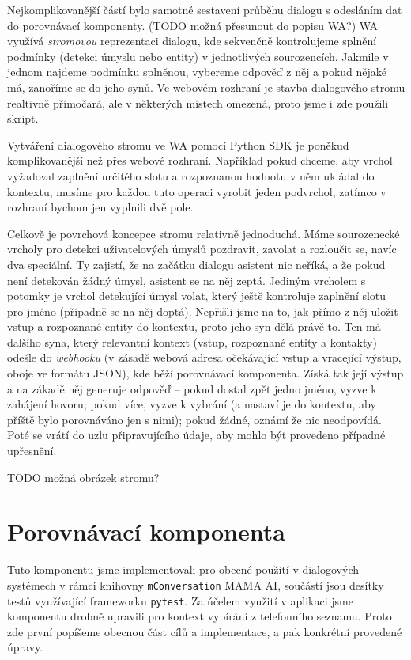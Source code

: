 Nejkomplikovanější částí bylo samotné sestavení průběhu dialogu s odesláním
dat do porovnávací komponenty. (TODO možná přesunout do popisu WA?) WA využívá
\textit{stromovou} reprezentaci dialogu,
kde sekvenčně kontrolujeme splnění podmínky (detekci úmyslu nebo entity) v
jednotlivých sourozencích. Jakmile v jednom najdeme podmínku splněnou, vybereme
odpověď z něj a pokud nějaké má, zanoříme se do jeho synů. Ve webovém rozhraní je
stavba dialogového stromu realtivně přímočará, ale v některých místech omezená,
proto jsme i zde použili skript.

Vytváření dialogového stromu ve WA pomocí Python SDK je poněkud komplikovanější
než přes webové rozhraní. Například pokud chceme, aby vrchol vyžadoval zaplnění
určitého slotu a rozpoznanou hodnotu v něm ukládal do kontextu, musíme pro
každou tuto operaci vyrobit jeden podvrchol, zatímco v rozhraní bychom jen
vyplnili dvě pole.

Celkově je povrchová koncepce stromu relativně jednoduchá. Máme sourozenecké
vrcholy pro detekci uživatelových úmyslů pozdravit, zavolat a rozloučit se, navíc
dva speciální. Ty zajistí, že na začátku dialogu asistent nic neříká, a že
pokud není detekován žádný úmysl, asistent se na něj zeptá. Jediným vrcholem
s potomky je vrchol detekující úmysl volat, který ještě kontroluje zaplnění slotu
pro jméno (případně se na něj doptá). Nepřišli jsme na to, jak přímo z něj
uložit vstup a rozpoznané entity do kontextu, proto jeho syn dělá právě to. Ten
má dalšího syna, který relevantní kontext (vstup, rozpoznané entity a kontakty)
odešle do \textit{webhooku} (v zásadě webová adresa očekávající vstup a vracející
výstup, oboje ve formátu JSON), kde běží porovnávací komponenta. Získá tak její
výstup a na zákadě něj generuje odpověď -- pokud dostal zpět jedno jméno,
vyzve k zahájení hovoru; pokud více, vyzve k vybrání (a nastaví je do kontextu,
aby příště bylo porovnáváno jen s nimi); pokud žádné, oznámí že nic neodpovídá.
Poté se vrátí do uzlu připravujícího údaje, aby mohlo být provedeno případné
upřesnění.

TODO možná obrázek stromu?

\section{Porovnávací komponenta}\label{matching}

Tuto komponentu jsme implementovali pro obecné použití v dialogových systémech
v rámci knihovny \texttt{mConversation} MAMA AI, součástí jsou desítky testů
využívající frameworku \texttt{pytest}. Za účelem využití v aplikaci jsme komponentu
drobně upravili pro kontext vybírání z telefonního seznamu. Proto zde první popíšeme
obecnou část cílů a implementace, a pak konkrétní provedené úpravy.


